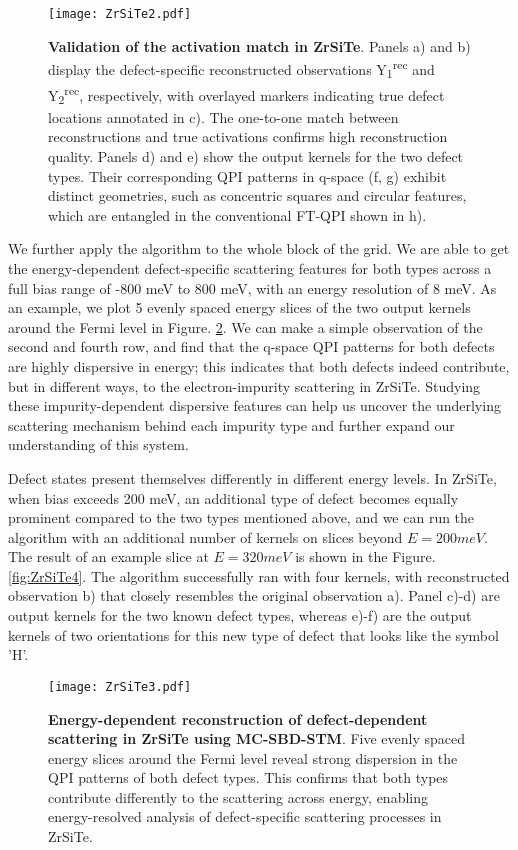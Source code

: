 \begin{figure}
	\texttt{[image: ZrSiTe2.pdf]} 
	\centering
	\caption[\textbf{Validation of the activation match in ZrSiTe}]{\textbf{Validation of the activation match in ZrSiTe}. Panels a) and b) display the defect-specific reconstructed observations Y\textsubscript{1}\textsuperscript{rec} and Y\textsubscript{2}\textsuperscript{rec}, respectively, with overlayed markers indicating true defect locations annotated in c). The one-to-one match between reconstructions and true activations confirms high reconstruction quality. Panels d) and e) show the output kernels for the two defect types. Their corresponding QPI patterns in q-space (f, g) exhibit distinct geometries, such as concentric squares and circular features, which are entangled in the conventional FT-QPI shown in h).}
	\label{fig:ZrSiTe2}
\end{figure}

We further apply the algorithm to the whole block of the grid. We are able to get the energy-dependent defect-specific scattering features for both types across a full bias range of -800 meV to 800 meV, with an energy resolution of 8 meV. As an example, we plot 5 evenly spaced energy slices of the two output kernels around the Fermi level in Figure. \ref{fig:ZrSiTe3}. We can make a simple observation of the second and fourth row, and find that the q-space QPI patterns for both defects are highly dispersive in energy; this indicates that both defects indeed contribute, but in different ways, to the electron-impurity scattering in ZrSiTe. Studying these impurity-dependent dispersive features can help us uncover the underlying scattering mechanism behind each impurity type and further expand our understanding of this system. 

Defect states present themselves differently in different energy levels. In ZrSiTe, when bias exceeds 200 meV, an additional type of defect becomes equally prominent compared to the two types mentioned above, and we can run the algorithm with an additional number of kernels on slices beyond $E=200meV$. The result of an example slice at $E=320meV$ is shown in the Figure. \ref{fig:ZrSiTe4}. The algorithm successfully ran with four kernels, with reconstructed observation b) that closely resembles the original observation a). Panel c)-d) are output kernels for the two known defect types, whereas e)-f) are the output kernels of two orientations for this new type of defect that looks like the symbol 'H'.  

\begin{figure}
	\texttt{[image: ZrSiTe3.pdf]} 
	\centering
	\caption[\textbf{Energy-dependent reconstruction of defect-dependent scattering in ZrSiTe using MC-SBD-STM}]{\textbf{Energy-dependent reconstruction of defect-dependent scattering in ZrSiTe using MC-SBD-STM}. Five evenly spaced energy slices around the Fermi level reveal strong dispersion in the QPI patterns of both defect types. This confirms that both types contribute differently to the scattering across energy, enabling energy-resolved analysis of defect-specific scattering processes in ZrSiTe.}
	\label{fig:ZrSiTe3}
\end{figure}

